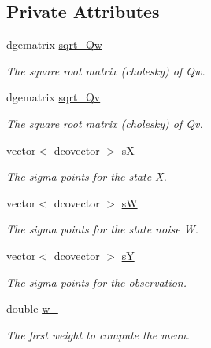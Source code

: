 \subsection*{Private Attributes}
\begin{CompactItemize}
\item 
dgematrix \hyperlink{class_unscented___kalman___filter_ec03d2f57b006cad497c6bb30dae67c8}{sqrt\_\-Qw}
\begin{CompactList}\small\item\em The square root matrix (cholesky) of Qw. \item\end{CompactList}\item 
dgematrix \hyperlink{class_unscented___kalman___filter_633326bb2df6487da083ff8c7e09acdd}{sqrt\_\-Qv}
\begin{CompactList}\small\item\em The square root matrix (cholesky) of Qv. \item\end{CompactList}\item 
vector$<$ dcovector $>$ \hyperlink{class_unscented___kalman___filter_cd473b335bae84f2da4a18f412962127}{sX}
\begin{CompactList}\small\item\em The sigma points for the state X. \item\end{CompactList}\item 
vector$<$ dcovector $>$ \hyperlink{class_unscented___kalman___filter_3a77ce84c121d28608edd4a6f550aeae}{sW}
\begin{CompactList}\small\item\em The sigma points for the state noise W. \item\end{CompactList}\item 
vector$<$ dcovector $>$ \hyperlink{class_unscented___kalman___filter_4e7f5cd7580c525eb27c489dd5785453}{sY}
\begin{CompactList}\small\item\em The sigma points for the observation. \item\end{CompactList}\item 
double \hyperlink{class_unscented___kalman___filter_59707b0a7653a0610266e553eb5786f6}{w\_}
\begin{CompactList}\small\item\em The first weight to compute the mean. \item\end{CompactList}\item 

\end{CompactItemize}
